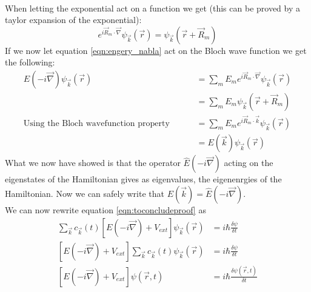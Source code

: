 \begin{myproof}
\begin{align}
	\end{align}
	When letting the exponential act on a function we get (this can be proved by a taylor expansion of the exponential):
	\begin{equation}
		e^{i\vec{R}_m\cdot\vec{\nabla}}\psi_{\vec{k}}(\vec{r}) = \psi_{\vec{k}}(\vec{r} + \vec{R}_m)
	\end{equation}
	If we now let equation \ref{eqn:engery_nabla} act on the Bloch wave function we get the following:
	\begin{align}
		\hat{E}(-i\vec{\nabla})\psi_{\vec{k}}(\vec{r}) &= \sum_m^{}E_me^{i\vec{R}_m\cdot\vec{\nabla}}\psi_{\vec{k}}(\vec{r}) \\
		&= \sum_m^{}E_m\psi_{\vec{k}}(\vec{r} + \vec{R}_m) \\
		\text{Using the Bloch wavefunction property }	\qquad &= \sum_m^{}E_me^{i\vec{R}_m\cdot\vec{k}}\psi_{\vec{k}}(\vec{r}) \\
		&= E(\vec{k})\psi_{\vec{k}}(\vec{r})
	\end{align}
	What we now have showed is that the operator $\hat{E}(-i\vec{\nabla})$ acting on the eigenstates of the Hamiltonian gives as eigenvalues, the eigenenrgies of the Hamiltonian. Now we can safely write that $E(\vec{k}) = \hat{E}(-i\vec{\nabla})$. \\
	We can now rewrite equation \ref{eqn:toconcludeproof} as
	\begin{align}
		\sum_{\vec{k}}^{} c_{\vec{k}}(t)\left[E(-i\vec{\nabla}) + V_{ext}\right]\psi_{\vec{k}}(\vec{r}) &= i\hbar\frac{\delta \psi}{\delta t} \\
		\left[E(-i\vec{\nabla}) + V_{ext}\right]\sum_{\vec{k}}^{} c_{\vec{k}}(t)\psi_{\vec{k}}(\vec{r}) &= i\hbar\frac{\delta \psi}{\delta t} \\
		\left[E(-i\vec{\nabla}) + V_{ext}\right]\psi(\vec{r}, t) &= i\hbar\frac{\delta \psi(\vec{r}, t)}{\delta t} \label{eqn:eff_mass_theorem}
	\end{align}
\end{myproof}
